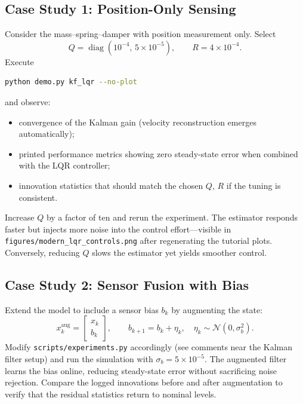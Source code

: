 \subsection{Case Study 1: Position-Only Sensing}
Consider the mass--spring--damper with position measurement only. Select
\[
    Q = \operatorname{diag}(10^{-4},\, 5\times 10^{-5}), \qquad R = 4\times 10^{-4}.
\]
Execute
\begin{lstlisting}[language=bash]
python demo.py kf_lqr --no-plot
\end{lstlisting}
and observe:
\begin{itemize}[leftmargin=*]
    \item convergence of the Kalman gain (velocity reconstruction emerges automatically);
    \item printed performance metrics showing zero steady-state error when combined with the LQR controller;
    \item innovation statistics that should match the chosen $Q$, $R$ if the tuning is consistent.
\end{itemize}
Increase $Q$ by a factor of ten and rerun the experiment. The estimator responds faster but injects more noise into the control effort---visible in \texttt{figures/modern\_lqr\_controls.png} after regenerating the tutorial plots. Conversely, reducing $Q$ slows the estimator yet yields smoother control.

\subsection{Case Study 2: Sensor Fusion with Bias}
Extend the model to include a sensor bias $b_k$ by augmenting the state:
\[
    x_k^\text{aug} = \begin{bmatrix} x_k \\ b_k \end{bmatrix}, \qquad
    b_{k+1} = b_k + \eta_k,\quad \eta_k \sim \mathcal{N}(0, \sigma_b^2).
\]
Modify \texttt{scripts/experiments.py} accordingly (see comments near the Kalman filter setup) and run the simulation with $\sigma_b = 5\times 10^{-5}$. The augmented filter learns the bias online, reducing steady-state error without sacrificing noise rejection. Compare the logged innovations before and after augmentation to verify that the residual statistics return to nominal levels.


